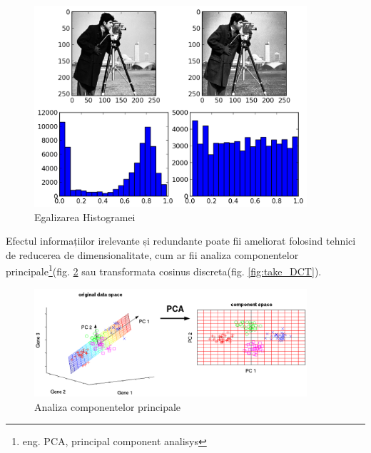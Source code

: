 \begin{figure}[H]
	\includegraphics[width=0.90\textwidth]{imagini/HistogramEqualization-1.png}
	\caption{Egalizarea Histogramei}
	\label{fig:egalizarea_histogrameis}
\end{figure}


Efectul informațiilor irelevante și redundante poate fii ameliorat folosind tehnici de reducerea de dimensionalitate, cum ar fii analiza componentelor principale\footnote{eng. PCA, principal component analisys}(fig. \ref{fig:fig_pca_principal_component_analysis} sau transformata cosinus discreta(fig. \ref{fig:take_DCT}).

\begin{figure}[H]
	\centering
		\includegraphics[width=0.90\textwidth]{imagini/fig_pca_principal_component_analysis.png}
	\caption{Analiza componentelor principale}
	\label{fig:fig_pca_principal_component_analysis}
\end{figure}

